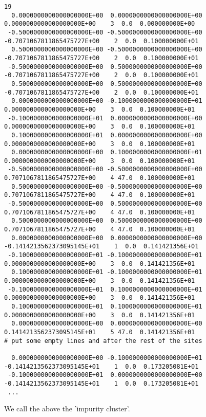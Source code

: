 \documentclass[a4paper,10pt,fullpage]{report}
\begin{document}
\begin{verbatim}
19
  0.0000000000000000000E+00  0.0000000000000000000E+00  0.0000000000000000000E+00    3  0.0  0.000000000E+00
 -0.5000000000000000000E+00 -0.5000000000000000000E+00 -0.7071067811865475727E+00    2  0.0  0.100000000E+01
  0.5000000000000000000E+00 -0.5000000000000000000E+00 -0.7071067811865475727E+00    2  0.0  0.100000000E+01
 -0.5000000000000000000E+00  0.5000000000000000000E+00 -0.7071067811865475727E+00    2  0.0  0.100000000E+01
  0.5000000000000000000E+00  0.5000000000000000000E+00 -0.7071067811865475727E+00    2  0.0  0.100000000E+01
  0.0000000000000000000E+00 -0.1000000000000000000E+01  0.0000000000000000000E+00    3  0.0  0.100000000E+01
 -0.1000000000000000000E+01  0.0000000000000000000E+00  0.0000000000000000000E+00    3  0.0  0.100000000E+01
  0.1000000000000000000E+01  0.0000000000000000000E+00  0.0000000000000000000E+00    3  0.0  0.100000000E+01
  0.0000000000000000000E+00  0.1000000000000000000E+01  0.0000000000000000000E+00    3  0.0  0.100000000E+01
 -0.5000000000000000000E+00 -0.5000000000000000000E+00  0.7071067811865475727E+00    4 47.0  0.100000000E+01
  0.5000000000000000000E+00 -0.5000000000000000000E+00  0.7071067811865475727E+00    4 47.0  0.100000000E+01
 -0.5000000000000000000E+00  0.5000000000000000000E+00  0.7071067811865475727E+00    4 47.0  0.100000000E+01
  0.5000000000000000000E+00  0.5000000000000000000E+00  0.7071067811865475727E+00    4 47.0  0.100000000E+01
  0.0000000000000000000E+00  0.0000000000000000000E+00 -0.1414213562373095145E+01    1  0.0  0.141421356E+01
 -0.1000000000000000000E+01 -0.1000000000000000000E+01  0.0000000000000000000E+00    3  0.0  0.141421356E+01
  0.1000000000000000000E+01 -0.1000000000000000000E+01  0.0000000000000000000E+00    3  0.0  0.141421356E+01
 -0.1000000000000000000E+01  0.1000000000000000000E+01  0.0000000000000000000E+00    3  0.0  0.141421356E+01
  0.1000000000000000000E+01  0.1000000000000000000E+01  0.0000000000000000000E+00    3  0.0  0.141421356E+01
  0.0000000000000000000E+00  0.0000000000000000000E+00  0.1414213562373095145E+01    5 47.0  0.141421356E+01
# put some empty lines and after the rest of the sites

  0.0000000000000000000E+00 -0.1000000000000000000E+01 -0.1414213562373095145E+01    1  0.0  0.173205081E+01
 -0.1000000000000000000E+01  0.0000000000000000000E+00 -0.1414213562373095145E+01    1  0.0  0.173205081E+01
 ...
\end{verbatim}
We call the above the 'impurity cluster'. 
\end{document}
